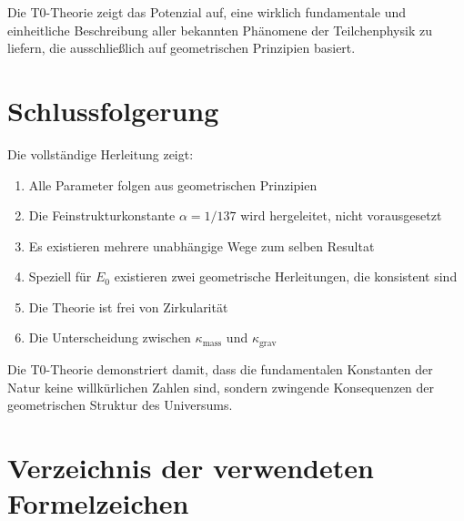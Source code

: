 \documentclass[12pt,a4paper]{article}
\begin{document}
Die T0-Theorie zeigt das Potenzial auf, eine wirklich fundamentale und einheitliche Beschreibung aller bekannten Phänomene der Teilchenphysik zu liefern, die ausschließlich auf geometrischen Prinzipien basiert.

	\section{Schlussfolgerung}
	
	Die vollständige Herleitung zeigt:
	\begin{enumerate}
		\item Alle Parameter folgen aus geometrischen Prinzipien
		\item Die Feinstrukturkonstante $\alpha = 1/137$ wird hergeleitet, nicht vorausgesetzt
		\item Es existieren mehrere unabhängige Wege zum selben Resultat
		\item Speziell für $E_0$ existieren zwei geometrische Herleitungen, die konsistent sind
		\item Die Theorie ist frei von Zirkularität
		\item Die Unterscheidung zwischen $\kappa_{\text{mass}}$ und $\kappa_{\text{grav}}$
	\end{enumerate}
	
	Die T0-Theorie demonstriert damit, dass die fundamentalen Konstanten der Natur keine willkürlichen Zahlen sind, sondern zwingende Konsequenzen der geometrischen Struktur des Universums.

\appendix
\section{Verzeichnis der verwendeten Formelzeichen}
\label{app:symbols_de}
\end{document}
